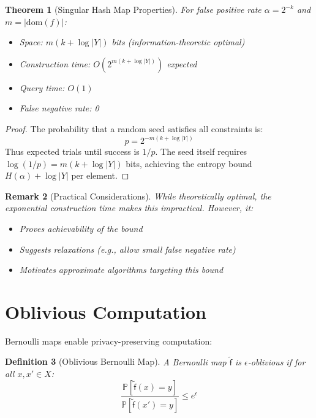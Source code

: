 \documentclass[11pt,final,hidelinks]{article}
\newtheorem{theorem}{Theorem}[section]
\newtheorem{definition}[theorem]{Definition}
\newtheorem{remark}[theorem]{Remark}
\newcommand{\obs}[1]{\widetilde{#1}}  %
\newcommand{\AFun}[1]{\obs{\mathsf{#1}}}  %
\newcommand{\Set}[1]{#1}              %
\newcommand{\Prob}[1]{\mathbb{P}\left[#1\right]}
\newcommand{\fprate}{\alpha}
\begin{document}
\begin{theorem}[Singular Hash Map Properties]
For false positive rate $\fprate = 2^{-k}$ and $m = |\text{dom}(f)|$:
\begin{itemize}
    \item Space: $m(k + \log |Y|)$ bits (information-theoretic optimal)
    \item Construction time: $O(2^{m(k + \log |Y|)})$ expected
    \item Query time: $O(1)$
    \item False negative rate: 0
\end{itemize}
\end{theorem}

\begin{proof}
The probability that a random seed satisfies all constraints is:
\begin{equation}
p = 2^{-m(k + \log |Y|)}
\end{equation}
Thus expected trials until success is $1/p$. The seed itself requires $\log(1/p) = m(k + \log |Y|)$ bits, achieving the entropy bound $H(\fprate) + \log |Y|$ per element.
\end{proof}

\begin{remark}[Practical Considerations]
While theoretically optimal, the exponential construction time makes this impractical. However, it:
\begin{itemize}
    \item Proves achievability of the bound
    \item Suggests relaxations (e.g., allow small false negative rate)
    \item Motivates approximate algorithms targeting this bound
\end{itemize}
\end{remark}

\section{Oblivious Computation}

Bernoulli maps enable privacy-preserving computation:

\begin{definition}[Oblivious Bernoulli Map]
A Bernoulli map $\AFun{f}$ is $\epsilon$-oblivious if for all $x, x' \in \Set{X}$:
\begin{equation}
\frac{\Prob{\AFun{f}(x) = y}}{\Prob{\AFun{f}(x') = y}} \leq e^\epsilon
\end{equation}
\end{definition}
\end{document}
